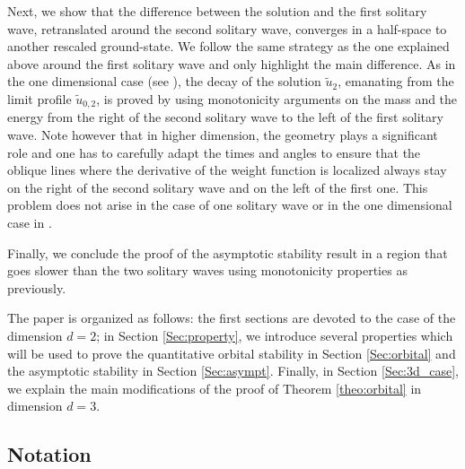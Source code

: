 \documentclass[reqno,10pt]{amsart}
\numberwithin{equation}{section}
\begin{document}
Next, we show that the difference between the solution and the first solitary wave, retranslated around the second solitary wave, converges in a half-space to another rescaled ground-state. We follow the same strategy as the one explained above around the first solitary wave and only highlight the main difference. As in the one dimensional case (see \cite{MMT02}), the decay of the solution $\tilde{u}_2$, emanating from the limit profile $\tilde{u}_{0,2}$, is proved by using monotonicity arguments on the mass and the energy from the right of the second solitary wave to the left of the first solitary wave. Note however that in higher dimension, the geometry plays a significant role and one has to carefully adapt the times and angles to ensure that the oblique lines where the derivative of the weight function is localized always stay on the right of the second solitary wave and on the left of the first one. This problem does not arise in the case of one solitary wave \cite{CMPS16,FHRY23} or in the one dimensional case in \cite{MMT02,MM08}.

Finally, we conclude the proof of the asymptotic stability result in a region that goes slower than the two solitary waves using monotonicity properties as previously.

\medskip 
The paper is organized as follows: the first sections are devoted to the case of the dimension $d=2$; in Section \ref{Sec:property}, we introduce several properties which will be used  to prove the quantitative orbital stability in Section \ref{Sec:orbital} and the asymptotic stability in Section \ref{Sec:asympt}. Finally, in Section \ref{Sec:3d_case}, we explain the main modifications of the proof of Theorem \ref{theo:orbital} in dimension $d=3$.

 
	\subsection{Notation}
	
\end{document}
